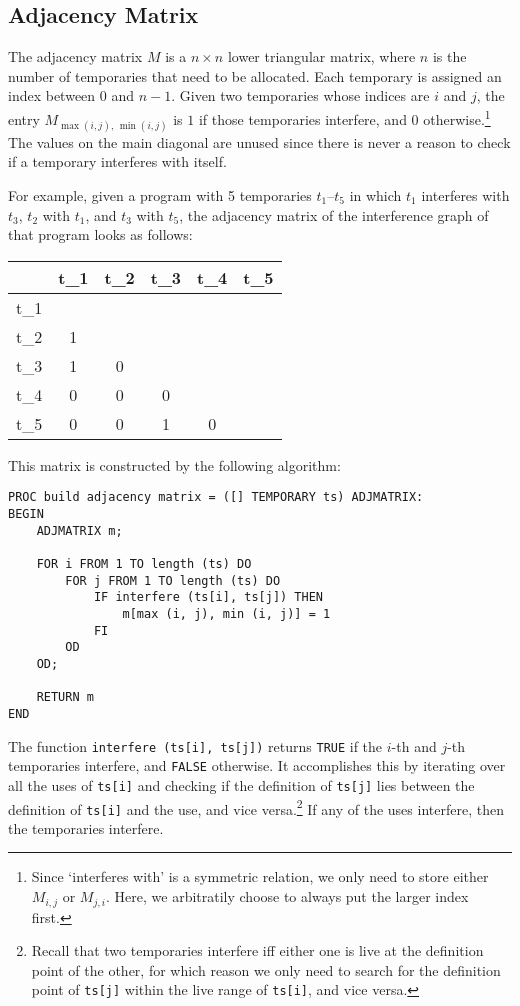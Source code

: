 \documentclass[12pt]{report}
\begin{document}
\subsection{Adjacency Matrix}
The adjacency matrix $M$ is a $n×n$ lower triangular matrix, where $n$ is the number of temporaries that need to be allocated. Each temporary
is assigned an index between $0$ and $n-1$. Given two temporaries whose indices are $i$ and $j$, the entry $M_{\max(i,j),\,\min(i, j)}$ is $1$ if
those temporaries interfere, and $0$ otherwise.\footnote{Since ‘interferes with’ is a symmetric relation, we only need to store either
$M_{i,j}$ or $M_{j, i}$. Here, we arbitratily choose to always put the larger index first.} The values on the main diagonal are unused since
there is never a reason to check if a temporary interferes with itself.

For example, given a program with 5 temporaries $t_1$–$t_5$ in which $t_1$ interferes with $t_3$, $t_2$ with $t_1$, and $t_3$ with $t_5$, the
adjacency matrix of the interference graph of that program looks as follows:\medskip

\noindent\begin{tabular}{@{}C|CCCCC}
 & t_1& t_2& t_3& t_4& t_5\\\hline
t_1& & & & & \\
t_2&1& & & & \\
t_3&1&0& & & \\
t_4&0&0&0& & \\
t_5&0&0&1&0& \\
\end{tabular}\medskip

\noindent This matrix is constructed by the following algorithm:
\begin{lstlisting}
PROC build adjacency matrix = ([] TEMPORARY ts) ADJMATRIX:
BEGIN
    ADJMATRIX m;

    FOR i FROM 1 TO length (ts) DO
        FOR j FROM 1 TO length (ts) DO
            IF interfere (ts[i], ts[j]) THEN
                m[max (i, j), min (i, j)] = 1
            FI
        OD
    OD;

    RETURN m
END
\end{lstlisting}

\noindent The function \verb|interfere (ts[i], ts[j])| returns \verb|TRUE| if the $i$-th and $j$-th temporaries interfere, and \verb|FALSE|
otherwise. It accomplishes this by iterating over all the uses of \verb|ts[i]| and checking if the definition of \verb|ts[j]| lies
between the definition of \verb|ts[i]| and the use, and vice versa.\footnote{Recall that two temporaries interfere iff either one is live
at the definition point of the other, for which reason we only need to search for the definition point of \texttt{ts[j]} within the live
range of \texttt{ts[i]}, and vice versa.} If any of the uses interfere, then the temporaries interfere.
\end{document}
